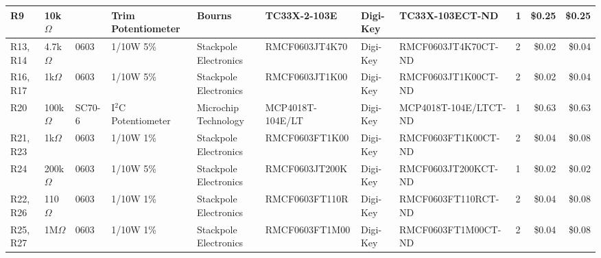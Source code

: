 \documentclass{article}
\begin{document}
\begin{center}
\begin{tabular}{| l | l | l | l | l | l | l | l | l | r | r |}
      \hline
      R9                      &  10k$\Omega$     &                    &  Trim Potentiometer                       &  Bourns                 &  TC33X-2-103E                   &  Digi-Key           &  TC33X-103ECT-ND             &  1             &  \$0.25              &  \$0.25 \\
      \hline
      R13, R14                &  4.7k$\Omega$    &  0603              &  1/10W 5\%                                &  Stackpole Electronics  &  RMCF0603JT4K70                 &  Digi-Key           &  RMCF0603JT4K70CT-ND         &  2             &  \$0.02              &  \$0.04 \\
      \hline
      R16, R17                &  1k$\Omega$      &  0603              &  1/10W 5\%                                &  Stackpole Electronics  &  RMCF0603JT1K00                 &  Digi-Key           &  RMCF0603JT1K00CT-ND         &  2             &  \$0.02              &  \$0.04 \\
      \hline
      R20                     &  100k$\Omega$    &  SC70-6            &  I$^2$C Potentiometer                     &  Microchip Technology   &  MCP4018T-104E/LT               &  Digi-Key           &  MCP4018T-104E/LTCT-ND       &  1             &  \$0.63              &  \$0.63 \\
      \hline
      R21, R23                &  1k$\Omega$      &  0603              &  1/10W 1\%                                &  Stackpole Electronics  &  RMCF0603FT1K00                 &  Digi-Key           &  RMCF0603FT1K00CT-ND         &  2             &  \$0.04              &  \$0.08 \\
      \hline
      R24                     &  200k$\Omega$    &  0603              &  1/10W 5\%                                &  Stackpole Electronics  &  RMCF0603JT200K                 &  Digi-Key           &  RMCF0603JT200KCT-ND         &  1             &  \$0.02              &  \$0.02 \\
      \hline
      R22, R26                &  110$\Omega$     &  0603              &  1/10W 1\%                                &  Stackpole Electronics  &  RMCF0603FT110R                 &  Digi-Key           &  RMCF0603FT110RCT-ND         &  2             &  \$0.04              &  \$0.08 \\
      \hline
      R25, R27                &  1M$\Omega$      &  0603              &  1/10W 1\%                                &  Stackpole Electronics  &  RMCF0603FT1M00                 &  Digi-Key           &  RMCF0603FT1M00CT-ND         &  2             &  \$0.04              &  \$0.08 \\

\end{tabular}
\end{center}
\end{document}
